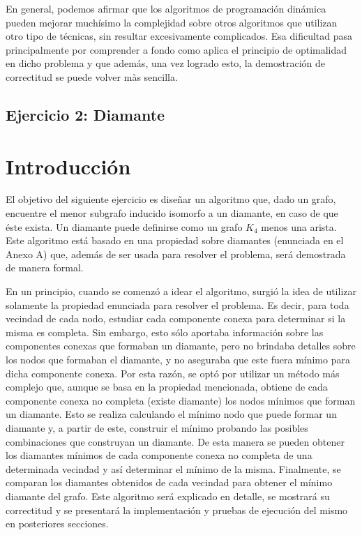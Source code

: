 \documentclass[a4paper,11pt] {article}
\begin{document}
En general, podemos afirmar que los algoritmos de programación dinámica pueden mejorar muchísimo la complejidad sobre otros algoritmos que utilizan otro tipo de técnicas, sin resultar excesivamente complicados. Esa dificultad pasa principalmente por comprender a fondo como aplica el principio de optimalidad en dicho problema y que además, una vez logrado esto, la demostración de correctitud se puede volver màs sencilla.

\bigskip

\begin{center}
\section*{Ejercicio 2: Diamante}
\end{center}

\bigskip
\section*{Introducci\'on}

El objetivo del siguiente ejercicio es dise\~{n}ar un algoritmo que, dado un grafo, encuentre el menor subgrafo inducido isomorfo a un diamante, en caso de que \'este exista. Un diamante puede definirse como un grafo $K_{4}$ menos una arista. Este algoritmo est\'a basado en una propiedad sobre diamantes (enunciada en el Anexo A) que, adem\'as de ser usada para resolver el problema, ser\'a demostrada de manera formal.

En un principio, cuando se comenz\'o a idear el algoritmo, surgi\'o la idea de utilizar solamente la propiedad enunciada para resolver el problema. Es decir, para toda vecindad de cada nodo, estudiar cada componente conexa para determinar si la misma es completa. Sin embargo, esto s\'olo aportaba informaci\'on sobre las componentes conexas que formaban un diamante, pero no brindaba detalles sobre los nodos que formaban el diamante, y no aseguraba que este fuera m\'inimo para dicha componente conexa. Por esta raz\'on, se opt\'o por utilizar un m\'etodo m\'as complejo que, aunque se basa en la propiedad mencionada, obtiene de cada componente conexa no completa (existe diamante) los nodos m\'inimos que forman un diamante. Esto se realiza calculando el m\'inimo nodo que puede formar un diamante y, a partir de este, construir el m\'inimo probando las posibles combinaciones que construyan un diamante. De esta manera se pueden obtener los diamantes m\'inimos de cada componente conexa no completa de una determinada vecindad y as\'i determinar el m\'inimo de la misma. Finalmente, se comparan los diamantes obtenidos de cada vecindad para obtener el m\'inimo diamante del grafo. Este algoritmo ser\'a explicado en detalle, se mostrar\'a su correctitud y se presentar\'a la implementaci\'on y pruebas de ejecuci\'on del mismo en posteriores secciones.
\end{document}
